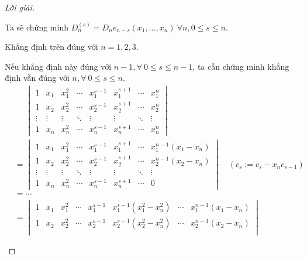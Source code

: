 \documentclass[class=nhvh-linear-algebra,crop=false]{standalone}
\begin{document}
\begin{proof}[Lời giải]
\begin{enumerate}[label = (\alph*)]
		      \par Ta sẽ chứng minh $D_{n}^{(s)} = D_{n}e_{n-s}(x_{1},\ldots, x_{n})\ \forall n, 0\le s\le n$.
		      \par Khẳng định trên đúng với $n = 1, 2, 3$.
		      \par Nếu khẳng định này đúng với $n - 1, \forall\ 0\le s\le n-1$, ta cần chứng minh khẳng định vẫn đúng với $n, \forall\ 0\le s\le n$.
		      \begin{align*}
			       & \phantom{=}\begin{vmatrix}
				                    1      & x_{1}  & x_{1}^{2} & \cdots & x_{1}^{s-1} & x_{1}^{s+1} & \cdots & x_{1}^{n} \\
				                    1      & x_{2}  & x_{2}^{2} & \cdots & x_{2}^{s-1} & x_{2}^{s+1} & \cdots & x_{2}^{n} \\
				                    \vdots & \vdots & \vdots    & \ddots & \vdots      & \vdots      & \ddots & \vdots    \\
				                    1      & x_{n}  & x_{n}^{2} & \cdots & x_{n}^{s-1} & x_{n}^{s+1} & \cdots & x_{n}^{n}
			                    \end{vmatrix}                                          \\
			       & =
			      \begin{vmatrix}
				      1      & x_{1}  & x_{1}^{2} & \cdots & x_{1}^{s-1} & x_{1}^{s+1} & \cdots & x_{1}^{n-1}(x_{1} - x_{n}) \\
				      1      & x_{2}  & x_{2}^{2} & \cdots & x_{2}^{s-1} & x_{2}^{s+1} & \cdots & x_{2}^{n-1}(x_{2} - x_{n}) \\
				      \vdots & \vdots & \vdots    & \ddots & \vdots      & \vdots      & \ddots & \vdots                     \\
				      1      & x_{n}  & x_{n}^{2} & \cdots & x_{n}^{s-1} & x_{n}^{s+1} & \cdots & 0
			      \end{vmatrix}\quad(c_{s}:=c_{s} - x_{n}c_{s-1})                                       \\
			       & = \cdots                                                                                                                                  \\
			       & =
			      \begin{vmatrix}
				      1      & x_{1}  & x_{1}^{2} & \cdots & x_{1}^{s-1} & x_{1}^{s-1}(x_{1}^{2} - x_{n}^{2}) & \cdots & x_{1}^{n-1}(x_{1} - x_{n}) \\
				      1      & x_{2}  & x_{2}^{2} & \cdots & x_{2}^{s-1} & x_{2}^{s-1}(x_{2}^{2} - x_{n}^{2}) & \cdots & x_{2}^{n-1}(x_{2} - x_{n}) \\

\end{vmatrix}
\end{align*}
\end{enumerate}
\end{proof}
\end{document}
